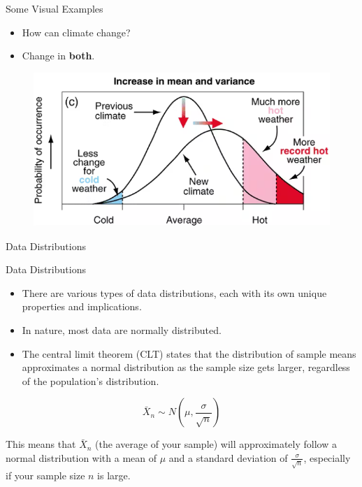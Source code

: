 \documentclass[
  ignorenonframetext,
]{beamer}
\providecommand{\tightlist}{%
  \setlength{\itemsep}{0pt}\setlength{\parskip}{0pt}}
\begin{document}
\begin{frame}{Some Visual Examples}
\label{some-visual-examples-2}
\begin{itemize}
\tightlist
\item
  How can climate change?
\end{itemize}

\begin{itemize}
\tightlist
\item
  Change in \textbf{both}.
\end{itemize}

\begin{figure}
\includegraphics[width=0.6\linewidth]{fig/climate3} \end{figure}
\end{frame}

\begin{frame}{Data Distributions}
\label{data-distributions}
\end{frame}

\begin{frame}{Data Distributions}
\label{data-distributions-1}
\begin{itemize}
\item
  There are various types of data distributions, each with its own
  unique properties and implications.
\item
  In nature, most data are normally distributed.
\item
  The central limit theorem (CLT) states that the distribution of sample
  means approximates a normal distribution as the sample size gets
  larger, regardless of the population's distribution.
\end{itemize}

\[
\bar{X}_n \sim N\left(\mu, \frac{\sigma}{\sqrt{n}}\right)
\]

This means that \(\bar{X}_n\) (the average of your sample) will
approximately follow a normal distribution with a mean of \(\mu\) and a
standard deviation of \(\frac{\sigma}{\sqrt{n}}\), especially if your
sample size \(n\) is large.
\end{frame}
\end{document}
